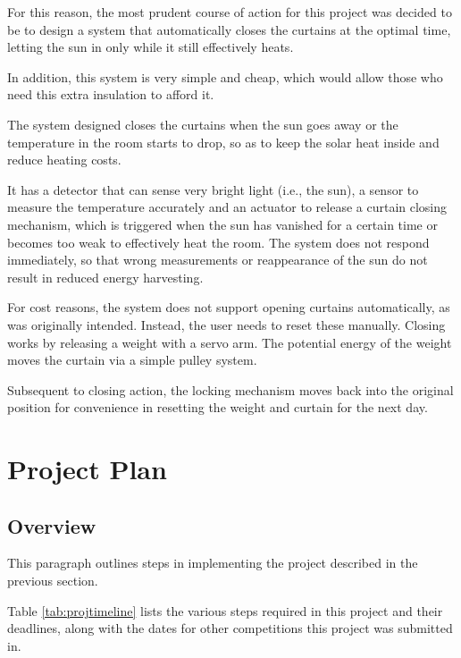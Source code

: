 \documentclass[a4paper,12pt]{article}
\begin{document}
For this reason, the most prudent course of action for this project was decided to be to design a system that automatically closes the curtains at the optimal time, 
letting the sun in only while it still effectively heats. 

In addition, this system is very simple and cheap, which would allow those who need this extra insulation to afford it.

The system designed closes the curtains when the sun goes away or the temperature in the room starts to drop, so as to keep the solar heat inside 
and reduce heating costs.

It has a detector that can sense very bright light (i.e., the sun), a sensor to measure the temperature accurately and an actuator to 
release a curtain closing mechanism, which is triggered when the sun has vanished for a certain time or becomes too weak to effectively heat the room.
 The system does not respond immediately, so that wrong measurements or reappearance of the sun do not result in reduced energy harvesting.


For cost reasons, the system does not support opening curtains automatically, as was originally intended. Instead, the user needs to reset these manually.
Closing works by releasing a weight with a servo arm. The potential energy of the weight moves the curtain via a simple pulley system.

Subsequent to closing action, the locking mechanism moves back into the original position for convenience in resetting the weight and curtain 
for the next day.

\section{Project Plan}

\subsection{Overview}

This paragraph outlines steps in implementing the project described in the previous section.

Table \ref{tab:projtimeline} lists the various steps required in this project and their deadlines, along with the dates for other competitions this project was submitted in.
\end{document}
